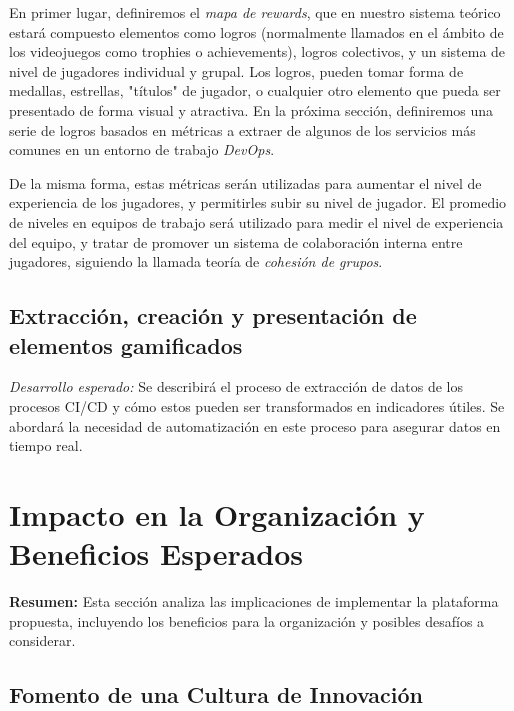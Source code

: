 \documentclass[journal]{IEEEtran}
\begin{document}
En primer lugar, definiremos el \textit{mapa de rewards}, que en nuestro sistema teórico estará compuesto elementos como logros (normalmente llamados en el ámbito de los videojuegos como trophies o achievements), logros colectivos, y un sistema de nivel de jugadores individual y grupal. Los logros, pueden tomar forma de medallas, estrellas, "títulos" de jugador, o cualquier otro elemento que pueda ser presentado de forma visual y atractiva. En la próxima sección, definiremos una serie de logros basados en métricas a extraer de algunos de los servicios más comunes en un entorno de trabajo \textit{DevOps}.

De la misma forma, estas métricas serán utilizadas para aumentar el nivel de experiencia de los jugadores, y permitirles subir su nivel de jugador. El promedio de niveles en equipos de trabajo será utilizado para medir el nivel de experiencia del equipo, y tratar de promover un sistema de colaboración interna entre jugadores, siguiendo la llamada teoría de \textit{cohesión de grupos}\cite{mueller2024leveraging}.

\subsection{\textbf{Extracción, creación y presentación de elementos gamificados}}

\textit{Desarrollo esperado:} Se describirá el proceso de extracción de datos de los procesos CI/CD y cómo estos pueden ser transformados en indicadores útiles. Se abordará la necesidad de automatización en este proceso para asegurar datos en tiempo real.

\section{\textbf{\Large Impacto en la Organización y Beneficios Esperados}}

\textbf{Resumen:} Esta sección analiza las implicaciones de implementar la plataforma propuesta, incluyendo los beneficios para la organización y posibles desafíos a considerar.

\subsection{\textbf{Fomento de una Cultura de Innovación}}
\end{document}
